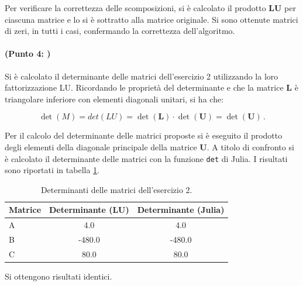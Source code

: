 \documentclass[letterpaper, 12pt]{article}
\begin{document}
Per verificare la correttezza delle scomposizioni, si è calcolato il prodotto $\mathbf{L}\mathbf{U}$ per ciascuna 
matrice e lo si è sottratto alla matrice originale. Si sono ottenute matrici di zeri, in tutti i casi, 
confermando la correttezza dell'algoritmo.

\paragraph{(Punto 4: )} Si è calcolato il determinante delle matrici dell'esercizio 2 utilizzando la loro
fattorizzazione LU. Ricordando le proprietà del determinante e che la matrice $\mathbf{L}$ è triangolare inferiore 
con elementi diagonali unitari, si ha che:

\begin{equation}
    \det(M) = det(LU) = \det(\mathbf{L}) \cdot \det(\mathbf{U}) = \det(\mathbf{U})\,.
\end{equation}

Per il calcolo del determinante delle matrici proposte si è eseguito il prodotto degli elementi della diagonale
principale della matrice $\mathbf{U}$. A titolo di confronto si è calcolato il determinante delle matrici con 
la funzione \texttt{det} di Julia. I risultati sono riportati in tabella \ref{tab:determinanti}.
\begin{table}[h!]
\centering
\caption{Determinanti delle matrici dell'esercizio 2.}
\label{tab:determinanti}
\begin{tabular}{|l|c|c|}
\hline
\textbf{Matrice} & \textbf{Determinante (LU)} & \textbf{Determinante (Julia)} \\
\hline
A                & 4.0                        & 4.0 \\
B                & -480.0                     & -480.0 \\
C                & 80.0                       & 80.0  \\
\hline
\end{tabular}
\end{table}

Si ottengono risultati identici.
\end{document}
